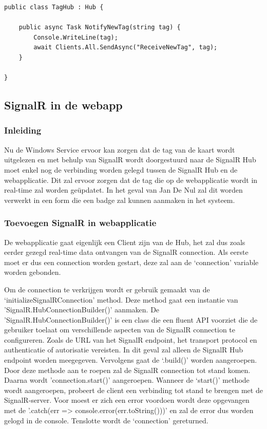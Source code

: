 \begin{verbatim} 
public class TagHub : Hub {
    
    public async Task NotifyNewTag(string tag) {
        Console.WriteLine(tag);
        await Clients.All.SendAsync("ReceiveNewTag", tag);
    }

}
\end{verbatim}

\subsection{SignalR in de webapp}

\subsubsection{Inleiding}
Nu de Windows Service ervoor kan zorgen dat de tag van de kaart wordt uitgelezen en met behulp van SignalR wordt doorgestuurd naar de SignalR Hub moet enkel nog de verbinding worden gelegd tussen de SignalR Hub en de webapplicatie. Dit zal ervoor zorgen dat de tag die op de webapplicatie wordt in real-time zal worden geüpdatet. In het geval van Jan De Nul zal dit worden verwerkt in een form die een badge zal kunnen aanmaken in het systeem. 

\subsubsection{Toevoegen SignalR in webapplicatie}
De webapplicatie gaat eigenlijk een Client zijn van de Hub, het zal dus zoals eerder gezegd real-time data ontvangen van de SignalR connection. Als eerste moet er dus een connection worden gestart, deze zal aan de ‘connection’ variable worden gebonden.  

Om de connection te verkrijgen wordt er gebruik gemaakt van de ‘initializeSignalRConnection’ method. Deze method gaat een instantie van 'SignalR.HubConnectionBuilder()’ aanmaken. De 'SignalR.HubConnectionBuilder()’ is een class die een fluent API voorziet die de gebruiker toelaat om verschillende aspecten van de SignalR connection te configureren. Zoals de URL van het SignalR endpoint, het transport protocol en authenticatie of autorisatie vereisten. In dit geval zal alleen de SignalR Hub endpoint worden meegegeven. Vervolgens gaat de ‘.build()’ worden aangeroepen. Door deze methode aan te roepen zal de SignalR connection tot stand komen. Daarna wordt 'connection.start()’ aangeroepen. Wanneer de ‘start()’ methode wordt aangeroepen, probeert de client een verbinding tot stand te brengen met de SignalR-server. Voor moest er zich een error voordoen wordt deze opgevangen met de '.catch(err => console.error(err.toString()))' en zal de error dus worden gelogd in de console. Tenslotte wordt de ‘connection’ gereturned. 

